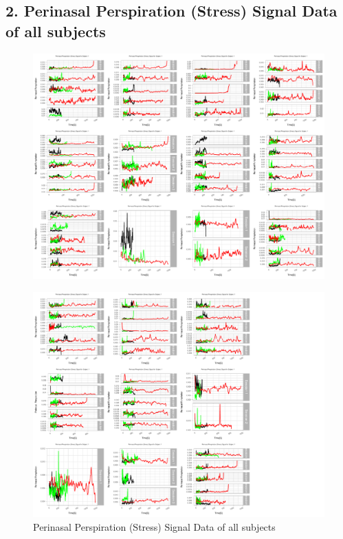 \documentclass[12pt,epsf]{report}
\begin{document}
{\subsection*{2. Perinasal Perspiration (Stress) Signal Data of all subjects}
\begin{figure}[!htb]
	\centering
	\includegraphics[width=1.0\textwidth]{Q4-1-title.pdf}
	\centering
\end{figure}
\begin{figure}[!htb]
	\centering
	\includegraphics[width=1.0\textwidth]{Q4-2-labels.pdf}
	\caption{Perinasal Perspiration (Stress) Signal Data of all subjects}
	\centering
\end{figure}
\FloatBarrier
}
\end{document}
